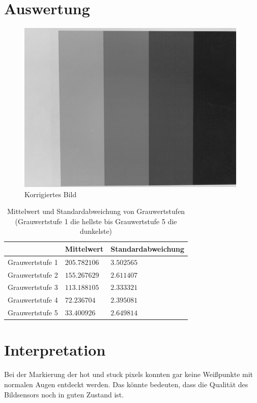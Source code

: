 \documentclass[12pt, oneside, a4paper, \docLanguage]{report}
\begin{document}
\section{Auswertung}
\label{chap:VERSUCH_4_AUSWERTUNG}
\begin{figure}[H]
	\centering\small
	\includegraphics[width=11cm]{Bild1_korrekt.png}
	\caption{Korrigiertes Bild}
\end{figure}
\begin{table}[H]
\centering
\begin{tabular}{|l|l|l|}
\hline
\multicolumn{1}{|c|}{} & \multicolumn{1}{c|}{Mittelwert} & \multicolumn{1}{c|}{Standardabweichung}\\ \hline
Grauwertstufe 1						&$205.782106$		&$3.502565$					\\ \hline
Grauwertstufe 2						&$155.267629$		&$2.611407$					\\ \hline
Grauwertstufe 3						&$113.188105$		&$2.333321$					\\ \hline
Grauwertstufe 4						&$72.236704$		&$2.395081$					\\ \hline
Grauwertstufe 5						&$33.400926$		&$2.649814$					\\ \hline
\end{tabular}
\caption{Mittelwert und Standardabweichung von Grauwertstufen (Grauwertstufe 1 die hellste bis Grauwertstufe 5 die dunkelste)}
\end{table}

\section{Interpretation}
\label{chap:VERSUCH_4_INTERPRETATION}
Bei der Markierung der hot und stuck pixels konnten gar keine Weißpunkte mit normalen Augen entdeckt werden. Das könnte bedeuten, dass die Qualität des Bildsensors noch in guten Zustand ist.
\end{document}
